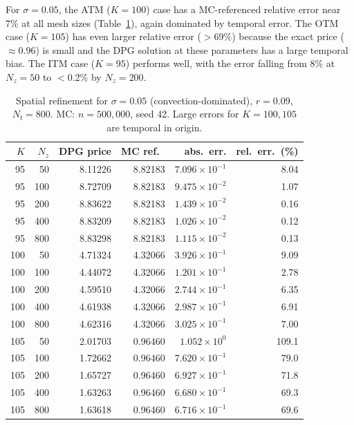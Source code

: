 \documentclass[11pt,a4paper]{article}
\newcommand{\Nz}{N_z}
\newcommand{\Nt}{N_t}
\begin{document}
For $\sigma = 0.05$, the ATM ($K = 100$) case has a MC-referenced
relative error near $7\%$ at all mesh sizes (Table~\ref{tab:sigma005}),
again dominated by temporal error.  The OTM case ($K = 105$) has even
larger relative error ($> 69\%$) because the exact price ($\approx 0.96$)
is small and the DPG solution at these parameters has a large temporal
bias.  The ITM case ($K = 95$) performs well, with the error falling from
$8\%$ at $\Nz = 50$ to $< 0.2\%$ by $\Nz = 200$.

\begin{table}[htbp]
\centering
\caption{Spatial refinement for $\sigma = 0.05$ (convection-dominated),
         $r = 0.09$, $\Nt = 800$. MC: $n = 500{,}000$, seed 42.
         Large errors for $K = 100, 105$ are temporal in origin.}
\label{tab:sigma005}
\small
\begin{tabular}{rrrrrr}
\toprule
$K$ & $\Nz$ & DPG price & MC ref.\ & abs.\ err. & rel.\ err.\ (\%) \\
\midrule
95  &   50 & 8.11226 & 8.82183 & $7.096\times10^{-1}$ & 8.04 \\
95  &  100 & 8.72709 & 8.82183 & $9.475\times10^{-2}$ & 1.07 \\
95  &  200 & 8.83622 & 8.82183 & $1.439\times10^{-2}$ & 0.16 \\
95  &  400 & 8.83209 & 8.82183 & $1.026\times10^{-2}$ & 0.12 \\
95  &  800 & 8.83298 & 8.82183 & $1.115\times10^{-2}$ & 0.13 \\
\midrule
100 &   50 & 4.71324 & 4.32066 & $3.926\times10^{-1}$ & 9.09 \\
100 &  100 & 4.44072 & 4.32066 & $1.201\times10^{-1}$ & 2.78 \\
100 &  200 & 4.59510 & 4.32066 & $2.744\times10^{-1}$ & 6.35 \\
100 &  400 & 4.61938 & 4.32066 & $2.987\times10^{-1}$ & 6.91 \\
100 &  800 & 4.62316 & 4.32066 & $3.025\times10^{-1}$ & 7.00 \\
\midrule
105 &   50 & 2.01703 & 0.96460 & $1.052\times10^{0}$  & 109.1 \\
105 &  100 & 1.72662 & 0.96460 & $7.620\times10^{-1}$ & 79.0 \\
105 &  200 & 1.65727 & 0.96460 & $6.927\times10^{-1}$ & 71.8 \\
105 &  400 & 1.63263 & 0.96460 & $6.680\times10^{-1}$ & 69.3 \\
105 &  800 & 1.63618 & 0.96460 & $6.716\times10^{-1}$ & 69.6 \\
\bottomrule
\end{tabular}
\end{table}
\end{document}
